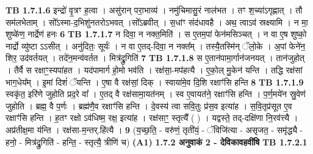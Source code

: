 \documentclass[17pt]{extarticle}
\begin{document}
                  \newline
                                \textbf{ TB 1.7.1.6} \newline
                  इन्द्रो॑ वृ॒त्रꣳ ह॒त्वा । असु॑रान् परा॒भाव्य॑ । नमु॑चिमासु॒रं नाल॑भत । तꣳ श॒च्या॑ऽगृह्णात् । तौ सम॑लभेताम् । सो᳚ऽस्मा-द॒भिशु॑नतरोऽभवत् ।सो᳚ऽब्रवीत् । स॒धांꣳ संद॑धावहै । अथ॒ त्वाऽव॑ स्रक्ष्यामि । न मा॒ शुष्के॑ण॒ नार्द्रेण॑ हनः \textbf{ 6} \newline
                  \newline
                                \textbf{ TB 1.7.1.7} \newline
                  न दिवा॒ न नक्त॒मिति॑ । स ए॒तम॒पां फेन॑मसिञ्चत् । न वा ए॒ष शुष्को॒ नार्द्रो व्यु॑ष्टा ऽऽसीत् । अनु॑दितः॒ सूर्यः॑ । न वा ए॒तद्-दिवा॒ न नक्त᳚म् । तस्यै॒तस्मि॑न् ॅलो॒के । अ॒पां फेने॑न॒ शिर॒ उद॑वर्तयत् । तदे॑न॒मन्व॑वर्तत । मित्र॑द्रु॒गिति॑ \textbf{ 7} \newline
                  \newline
                                \textbf{ TB 1.7.1.8} \newline
                  स ए॒तान॑पामा॒र्गान॑जनयत् । तान॑जुहोत् । तैर्वै स रक्षाꣳ॒॒स्यपा॑हत । यद॑पामार्ग हो॒मो भव॑ति । रक्ष॑सा॒-मप॑हत्यै । ए॒को॒ल् मु॒केन॑ यन्ति । तद्धि रक्ष॑सां भाग॒धेय᳚म् । इ॒मां दिशं॑ ॅयन्ति । ए॒षा वै रक्ष॑सां॒ दिक् । स्वाया॑मे॒व दि॒शि रक्षाꣳ॑सि हन्ति \textbf{ 8} \newline
                  \newline
                                \textbf{ TB 1.7.1.9} \newline
                  स्वकृ॑त॒ इरि॑णे जुहोति प्रद॒रे वा᳚ । ए॒तद् वै रक्ष॑सामा॒यत॑नम् । स्व ए॒वायत॑ने॒ रक्षाꣳ॑सि हन्ति । प॒र्ण॒मये॑न स्रु॒वेण॑ जुहोति । ब्रह्म॒ वै प॒र्णः । ब्रह्म॑णै॒व रक्षाꣳ॑सि हन्ति । दे॒वस्य॑ त्वा सवि॒तुः प्र॑स॒व इत्या॑ह । स॒वि॒तृप्र॑सूत ए॒व रक्षाꣳ॑सि हन्ति । ह॒तꣳ रक्षो ऽव॑धिष्म॒ रक्ष॒ इत्या॑ह । रक्ष॑साꣳ॒॒ स्तृत्यै᳚ ( ) । यद्वस्ते॒ तद्-दक्षि॑णा नि॒रव॑त्त्यै । अप्र॑तीक्ष॒मा य॑न्ति । रक्ष॑सा-म॒न्तर्.हि॑त्यै । \textbf{ 9} \newline
                  \newline
                                    (य॒च्छ॒ति॒ - वरु॑णं॒ तृती॑यं॒ - ॅविजि॑त्या - असृजत॒ - समृ॑द्ध्यै - हनो॒ - मित्र॑द्रु॒गिति॑ - हन्ति॒ - स्तृत्यै॒ त्रीणि॑ च) \textbf{(A1)} \newline \newline
                \textbf{ 1.7.2     अनुवाकं   2 - देविकावहवींषि} \newline
                                \textbf{ TB 1.7.2.1} \newline
\end{document}

